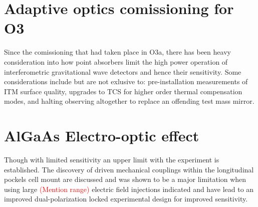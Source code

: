 \section{Adaptive optics comissioning for O3}
Since the comissioning that had taken place in O3a, there has been heavy consideration into how point absorbers limit the high power operation of interferometric gravitational wave detectors and hence their sensitivity. Some considerations include but are not exlusive to: pre-installation measurements of ITM surface quality, upgrades to TCS for higher order thermal compensation modes, and halting observing altogether to replace an offending test mass mirror. 

\section{AlGaAs Electro-optic effect}
Though with limited sensitivity an upper limit with the experiment is established. The discovery of driven mechanical couplings within the longitudinal pockels cell mount are discussed and was shown to be a major limitation when using large \textcolor{red}{(Mention range)} electric field injections indicated and have lead to an improved dual-polarization locked experimental design for improved sensitivity.

